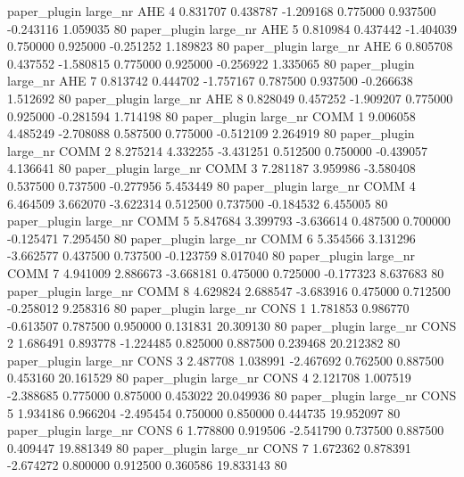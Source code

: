        paper_plugin   large_nr      AHE                 4  0.831707  0.438787  -1.209168 0.775000 0.937500 -0.243116    1.059035 80
       paper_plugin   large_nr      AHE                 5  0.810984  0.437442  -1.404039 0.750000 0.925000 -0.251252    1.189823 80
       paper_plugin   large_nr      AHE                 6  0.805708  0.437552  -1.580815 0.775000 0.925000 -0.256922    1.335065 80
       paper_plugin   large_nr      AHE                 7  0.813742  0.444702  -1.757167 0.787500 0.937500 -0.266638    1.512692 80
       paper_plugin   large_nr      AHE                 8  0.828049  0.457252  -1.909207 0.775000 0.925000 -0.281594    1.714198 80
       paper_plugin   large_nr     COMM                 1  9.006058  4.485249  -2.708088 0.587500 0.775000 -0.512109    2.264919 80
       paper_plugin   large_nr     COMM                 2  8.275214  4.332255  -3.431251 0.512500 0.750000 -0.439057    4.136641 80
       paper_plugin   large_nr     COMM                 3  7.281187  3.959986  -3.580408 0.537500 0.737500 -0.277956    5.453449 80
       paper_plugin   large_nr     COMM                 4  6.464509  3.662070  -3.622314 0.512500 0.737500 -0.184532    6.455005 80
       paper_plugin   large_nr     COMM                 5  5.847684  3.399793  -3.636614 0.487500 0.700000 -0.125471    7.295450 80
       paper_plugin   large_nr     COMM                 6  5.354566  3.131296  -3.662577 0.437500 0.737500 -0.123759    8.017040 80
       paper_plugin   large_nr     COMM                 7  4.941009  2.886673  -3.668181 0.475000 0.725000 -0.177323    8.637683 80
       paper_plugin   large_nr     COMM                 8  4.629824  2.688547  -3.683916 0.475000 0.712500 -0.258012    9.258316 80
       paper_plugin   large_nr     CONS                 1  1.781853  0.986770  -0.613507 0.787500 0.950000  0.131831   20.309130 80
       paper_plugin   large_nr     CONS                 2  1.686491  0.893778  -1.224485 0.825000 0.887500  0.239468   20.212382 80
       paper_plugin   large_nr     CONS                 3  2.487708  1.038991  -2.467692 0.762500 0.887500  0.453160   20.161529 80
       paper_plugin   large_nr     CONS                 4  2.121708  1.007519  -2.388685 0.775000 0.875000  0.453022   20.049936 80
       paper_plugin   large_nr     CONS                 5  1.934186  0.966204  -2.495454 0.750000 0.850000  0.444735   19.952097 80
       paper_plugin   large_nr     CONS                 6  1.778800  0.919506  -2.541790 0.737500 0.887500  0.409447   19.881349 80
       paper_plugin   large_nr     CONS                 7  1.672362  0.878391  -2.674272 0.800000 0.912500  0.360586   19.833143 80
